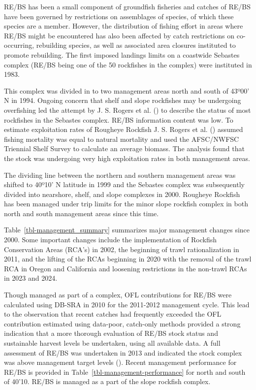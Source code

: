\documentclass[
]{scrartcl}
\begin{document}
RE/BS has been a small component of groundfish fisheries and catches of
RE/BS have been governed by restrictions on assemblages of species, of
which these species are a member. However, the distribution of fishing
effort in areas where RE/BS might be encountered has also been affected
by catch restrictions on co-occurring, rebuilding species, as well as
associated area closures instituted to promote rebuilding. The first
imposed landings limits on a coastwide Sebastes complex (RE/BS being one
of the 50 rockfishes in the complex) were instituted in 1983.

This complex was divided in to two management areas north and south of
43º00' N in 1994. Ongoing concern that shelf and slope rockfishes may be
undergoing overfishing led the attempt by J. S. Rogers et al.
() to describe the status of most
rockfishes in the Sebastes complex. RE/BS information content was low.
To estimate exploitation rates of Rougheye Rockfish J. S. Rogers et al.
() assumed fishing mortality was
equal to natural mortality and used the AFSC/NWFSC Triennial Shelf
Survey to calculate an average biomass. The analysis found that the
stock was undergoing very high exploitation rates in both management
areas.

The dividing line between the northern and southern management areas was
shifted to 40º10' N latitude in 1999 and the Sebastes complex was
subsequently divided into nearshore, shelf, and slope complexes in 2000.
Rougheye Rockfish has been managed under trip limits for the minor slope
rockfish complex in both north and south management areas since this
time.

Table~\ref{tbl-management_summary} summarizes major management changes
since 2000. Some important changes include the implementation of
Rockfish Conservation Areas (RCA's) in 2002, the beginning of trawl
rationalization in 2011, and the lifting of the RCAs beginning in 2020
with the removal of the trawl RCA in Oregon and California and loosening
restrictions in the non-trawl RCAs in 2023 and 2024.

Though managed as part of a complex, OFL contributions for RE/BS were
calculated using DB-SRA in 2010 for the 2011-2012 management cycle. This
lead to the observation that recent catches had frequently exceeded the
OFL contribution estimated using data-poor, catch-only methods provided
a strong indication that a more thorough evaluation of RE/BS stock
status and sustainable harvest levels be undertaken, using all available
data. A full assessment of RE/BS was undertaken in 2013 and indicated
the stock complex was above management target levels
().
Recent management performance for RE/BS is provided in
Table~\ref{tbl-management-performance} for north and south of 40'10.
RE/BS is managed as a part of the slope rockfish complex.
\end{document}
